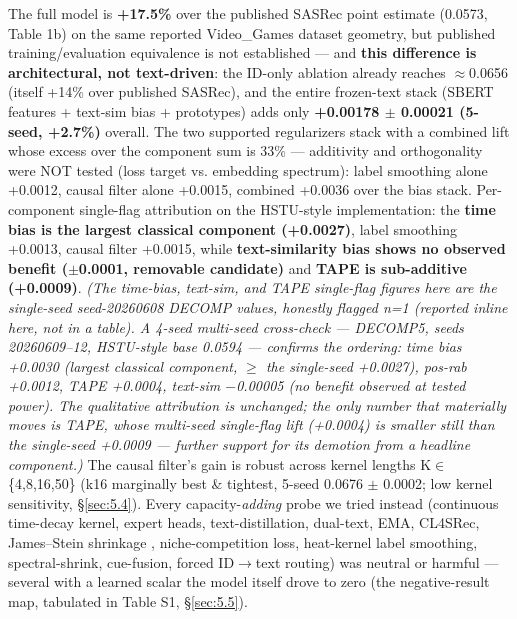 The full model is \textbf{+17.5\%} over the published SASRec point estimate (0.0573, Table 1b) on the same reported Video\_Games dataset geometry, but published training/evaluation equivalence is not established --- and \textbf{this difference is architectural, not text-driven}: the ID-only ablation already reaches \ensuremath{\approx}0.0656 (itself +14\% over published SASRec), and the entire frozen-text stack (SBERT features + text-sim bias + prototypes) adds only \textbf{+0.00178 \ensuremath{\pm} 0.00021 (5-seed, +2.7\%)} overall. The two supported regularizers stack with a combined lift whose excess over the component sum is 33\% --- additivity and orthogonality were NOT tested (loss target vs. embedding spectrum): label smoothing alone +0.0012, causal filter alone +0.0015, combined +0.0036 over the bias stack. Per-component single-flag attribution on the HSTU-style implementation: the \textbf{time bias is the largest classical component (+0.0027)}, label smoothing +0.0013, causal filter +0.0015, while \textbf{text-similarity bias shows no observed benefit (\ensuremath{\pm}0.0001, removable candidate)} and \textbf{TAPE is sub-additive (+0.0009)}. \emph{(The time-bias, text-sim, and TAPE single-flag figures here are the single-seed seed-20260608 DECOMP values, honestly flagged n=1 (reported inline here, not in a table). A 4-seed multi-seed cross-check --- DECOMP5, seeds 20260609--12, HSTU-style base 0.0594 --- confirms the ordering: time bias +0.0030 (largest classical component, \ensuremath{\ge} the single-seed +0.0027), pos-rab +0.0012, TAPE +0.0004, text-sim \ensuremath{-}0.00005 (no benefit observed at tested power). The qualitative attribution is unchanged; the only number that materially moves is TAPE, whose multi-seed single-flag lift (+0.0004) is smaller still than the single-seed +0.0009 --- further support for its demotion from a headline component.)} The causal filter's gain is robust across kernel lengths K\ensuremath{\in}\{4,8,16,50\} (k16 marginally best \& tightest, 5-seed 0.0676 \ensuremath{\pm} 0.0002; low kernel sensitivity, \S\ref{sec:5.4}). Every capacity-\emph{adding} probe we tried instead (continuous time-decay kernel, expert heads, text-distillation, dual-text, EMA, CL4SRec, James--Stein shrinkage \citep{james1961estimation,efron1973stein}, niche-competition loss, heat-kernel label smoothing, spectral-shrink, cue-fusion, forced ID\ensuremath{\rightarrow}text routing) was neutral or harmful --- several with a learned scalar the model itself drove to zero (the negative-result map, tabulated in Table S1, \S\ref{sec:5.5}).

